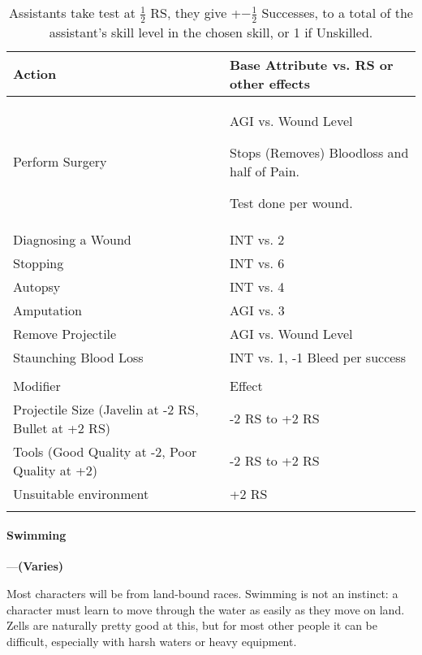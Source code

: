\documentclass[oneside,11pt,english]{book}
\begin{document}
\begin{longtabu} to 1\textwidth {X[1.5]X[r]}
	\caption{Surgery}
	\label{tab:Surgery}\\
	\rowfont[c]{}Action &Base Attribute vs. RS or other effects\\\toprule
Perform Surgery&	AGI vs. Wound Level

					Stops (Removes) Bloodloss and half of Pain.

					Test done per wound.\\
Diagnosing a Wound&INT vs. 2 \\
Stopping &INT vs. 6\\
Autopsy&INT vs. 4 \\
Amputation&AGI vs. 3 \\
Remove Projectile&AGI vs. Wound Level \\
Staunching Blood Loss&INT vs. 1, -1 Bleed per success \\
	\\
		\rowfont[c]{}Modifier&Effect\\\cmidrule(lr){1-2}
Projectile Size (Javelin at -2 RS, Bullet at +2 RS)&-2 RS to +2 RS\\
Tools (Good Quality at -2, Poor Quality at +2) &-2 RS to +2 RS\\
Unsuitable environment &+2 RS\\
\caption*{Assistants take test at $ \frac{1}{2} $ RS, they give +$ -\frac{1}{2} $ Successes, to a total of the assistant’s skill level in the chosen skill, or 1 if Unskilled.}
\end{longtabu}

\paragraph{\label{skill:Swimming}Swimming}---\quad\textbf{(Varies)}\par
Most characters will be from land-bound races. Swimming is not an instinct: a character must learn to move through the water as easily as they move on land. Zells are naturally pretty good at this, but for most other people it can be difficult, especially with harsh waters or heavy equipment.
\end{document}
